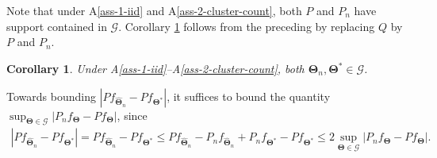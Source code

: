 \documentclass{article}
\newtheorem{cor}{Corollary}[section]
\begin{document}
Note that under A\ref{ass-1-iid} and A\ref{ass-2-cluster-count}, both $P$ and $P_n$ have support contained in $\mathscr{G}$. Corollary \ref{cor-4.2} follows from the preceding by replacing $Q$ by $P$ and $P_n$.

\begin{cor}\label{cor-4.2}
    Under A\ref{ass-1-iid}--A\ref{ass-2-cluster-count}, both $\widehat{\boldsymbol{\Theta}}_n, \boldsymbol{\Theta}^* \in \mathscr{G}$.
\end{cor}








Towards bounding $|P f_{\widehat{\bm{\Theta}}_n}-P f_{\bm{\Theta}^*}|$, it suffices to bound the quantity $\sup _{\bm{\Theta} \in\mathscr{G}}\left|P_n f_{\bm\Theta} - P f_{\bm\Theta}\right|$, since
\begin{align*}
    |P f_{\widehat{\bm{\Theta}}_n}- P f_{\bm{\Theta^*}}| 
    = P f_{\widehat{\bm{\Theta}}_n}-P f_{\bm{\Theta^*}} \le P f_{\widehat{\bm{\Theta}}_n}-P_n f_{\widehat{\bm{\Theta}}_n}+P_n f_{\bm{\Theta^*}} - P f_{\bm{\Theta^*}}\le 2\sup_{\bm{\Theta}\in \mathscr{G}}|P_n f_{\bm\Theta}-P f_{\bm\Theta}|.
\end{align*}
\end{document}
